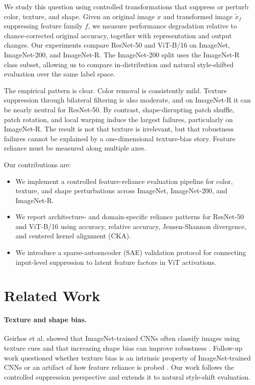 \documentclass[letterpaper]{article}
\begin{document}
We study this question using controlled transformations that suppress or
perturb color, texture, and shape. Given an original image $x$ and transformed
image $\tilde{x}_f$ suppressing feature family $f$, we measure performance
degradation relative to chance-corrected original accuracy, together with
representation and output changes. Our experiments compare ResNet-50 and
ViT-B/16 on ImageNet, ImageNet-200, and ImageNet-R. The ImageNet-200 split uses
the ImageNet-R class subset, allowing us to compare in-distribution and natural
style-shifted evaluation over the same label space.

The empirical pattern is clear. Color removal is consistently mild. Texture
suppression through bilateral filtering is also moderate, and on ImageNet-R it
can be nearly neutral for ResNet-50. By contrast, shape-disrupting patch
shuffle, patch rotation, and local warping induce the largest failures,
particularly on ImageNet-R. The result is not that texture is irrelevant, but
that robustness failures cannot be explained by a one-dimensional texture-bias
story. Feature reliance must be measured along multiple axes.

Our contributions are:
\begin{itemize}
    \item We implement a controlled feature-reliance evaluation pipeline for
    color, texture, and shape perturbations across ImageNet, ImageNet-200, and
    ImageNet-R.
    \item We report architecture- and domain-specific reliance patterns for
    ResNet-50 and ViT-B/16 using accuracy, relative accuracy, Jensen-Shannon
    divergence, and centered kernel alignment (CKA).
    \item We introduce a sparse-autoencoder (SAE) validation protocol for
    connecting input-level suppression to latent feature factors in ViT
    activations.
\end{itemize}

\section{Related Work}

\paragraph{Texture and shape bias.}
Geirhos et al. showed that ImageNet-trained CNNs often classify images using
texture cues and that increasing shape bias can improve robustness
\cite{geirhos2019imagenet}. Follow-up work questioned whether texture bias is
an intrinsic property of ImageNet-trained CNNs or an artifact of how feature
reliance is probed \cite{burgert2025feature}. Our work follows the controlled
suppression perspective and extends it to natural style-shift evaluation.
\end{document}
